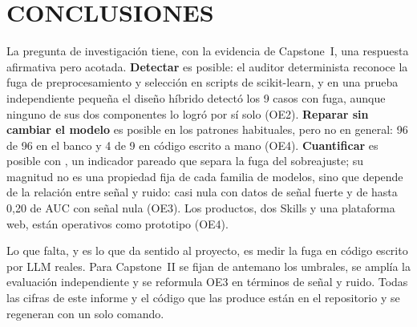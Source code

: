 
\chapter{CONCLUSIONES}
\label{ch:conclusiones}

La pregunta de investigación tiene, con la evidencia de Capstone~I, una respuesta afirmativa pero acotada. \textbf{Detectar} es posible: el auditor determinista reconoce la fuga de preprocesamiento y selección en scripts de scikit-learn, y en una prueba independiente pequeña el diseño híbrido detectó los 9 casos con fuga, aunque ninguno de sus dos componentes lo logró por sí solo (OE2). \textbf{Reparar sin cambiar el modelo} es posible en los patrones habituales, pero no en general: 96 de 96 en el banco y 4 de 9 en código escrito a mano (OE4). \textbf{Cuantificar} es posible con \DOpt, un indicador pareado que separa la fuga del sobreajuste; su magnitud no es una propiedad fija de cada familia de modelos, sino que depende de la relación entre señal y ruido: casi nula con datos de señal fuerte y de hasta 0,20 de AUC con señal nula (OE3). Los productos, dos Skills y una plataforma web, están operativos como prototipo (OE4).

Lo que falta, y es lo que da sentido al proyecto, es medir la fuga en código escrito por LLM reales. Para Capstone~II se fijan de antemano los umbrales, se amplía la evaluación independiente y se reformula OE3 en términos de señal y ruido. Todas las cifras de este informe y el código que las produce están en el repositorio y se regeneran con un solo comando.

